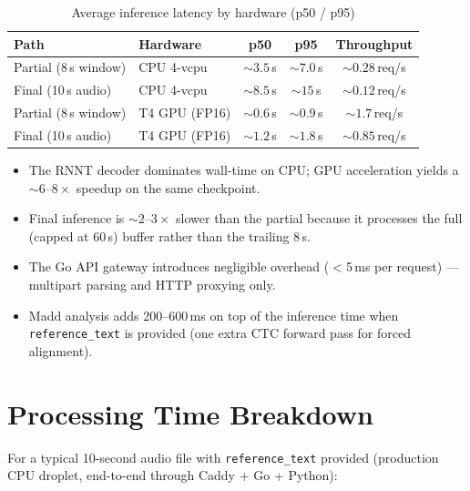 \begin{table}[H]
  \centering
  \caption{Average inference latency by hardware (p50 / p95)}
  \label{tab:perf_latency}
  \renewcommand{\arraystretch}{1.3}
  \begin{tabular}{llccc}
    \toprule
    \textbf{Path} & \textbf{Hardware} & \textbf{p50} & \textbf{p95} & \textbf{Throughput} \\
    \midrule
    Partial (8\,s window) & CPU 4-vcpu    & ${\sim}3.5$\,s & ${\sim}7.0$\,s & ${\sim}0.28$\,req/s \\
    Final (10\,s audio)   & CPU 4-vcpu    & ${\sim}8.5$\,s & ${\sim}15$\,s  & ${\sim}0.12$\,req/s \\
    Partial (8\,s window) & T4 GPU (FP16) & ${\sim}0.6$\,s & ${\sim}0.9$\,s & ${\sim}1.7$\,req/s  \\
    Final (10\,s audio)   & T4 GPU (FP16) & ${\sim}1.2$\,s & ${\sim}1.8$\,s & ${\sim}0.85$\,req/s \\
    \bottomrule
  \end{tabular}
\end{table}

\begin{infobox}[title=Key Observations]
\begin{itemize}
  \item The RNNT decoder dominates wall-time on CPU; GPU acceleration yields a ${\sim}6$--$8\times$ speedup on the same checkpoint.
  \item Final inference is ${\sim}2$--$3\times$ slower than the partial because it processes the full (capped at 60\,s) buffer rather than the trailing 8\,s.
  \item The Go API gateway introduces negligible overhead ($<$5\,ms per request) --- multipart parsing and HTTP proxying only.
  \item Madd analysis adds 200--600\,ms on top of the inference time when \texttt{reference\_text} is provided (one extra CTC forward pass for forced alignment).
\end{itemize}
\end{infobox}

\section{Processing Time Breakdown}

For a typical 10-second audio file with \texttt{reference\_text} provided (production CPU droplet, end-to-end through Caddy + Go + Python):

